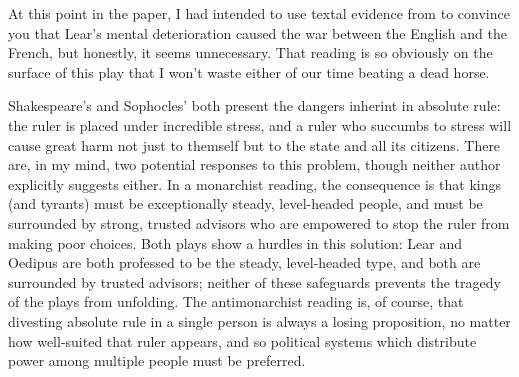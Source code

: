 
At this point in the paper, I had intended to use textal evidence from \lear{}
to convince you that Lear's mental deterioration caused the war between the
English and the French, but honestly, it seems unnecessary. That reading is so
obviously on the surface of this play that I won't waste either of our time
beating a dead horse.



Shakespeare's \lear{} and Sophocles' \oedipus{} both present the dangers
inherint in absolute rule: the ruler is placed under incredible stress, and a
ruler who succumbs to stress will cause great harm not just to themself but to
the state and all its citizens. There are, in my mind, two potential responses
to this problem, though neither author explicitly suggests either. In a
monarchist reading, the consequence is that kings (and tyrants) must be
exceptionally steady, level-headed people, and must be surrounded by strong,
trusted advisors who are empowered to stop the ruler from making poor
choices. Both plays show a hurdles in this solution: Lear and Oedipus are both
professed to be the steady, level-headed type, and both are surrounded by
trusted advisors; neither of these safeguards prevents the tragedy of the plays
from unfolding. The antimonarchist reading is, of course, that divesting
absolute rule in a single person is always a losing proposition, no matter how
well-suited that ruler appears, and so political systems which distribute power
among multiple people must be preferred.
